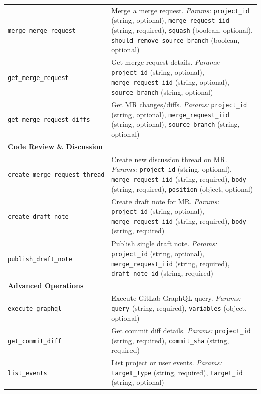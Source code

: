 \documentclass{article}
\theoremstyle{plain}
\theoremstyle{definition}
\theoremstyle{remark}
\begin{document}
{\begin{longtable}{p{4.5cm} p{10cm}}
\texttt{merge\_merge\_request} & Merge a merge request. \textit{Params:} \texttt{project\_id} (string, optional), \texttt{merge\_request\_iid} (string, required), \texttt{squash} (boolean, optional), \texttt{should\_remove\_source\_branch} (boolean, optional) \\

\texttt{get\_merge\_request} & Get merge request details. \textit{Params:} \texttt{project\_id} (string, optional), \texttt{merge\_request\_iid} (string, optional), \texttt{source\_branch} (string, optional) \\

\texttt{get\_merge\_request\_diffs} & Get MR changes/diffs. \textit{Params:} \texttt{project\_id} (string, optional), \texttt{merge\_request\_iid} (string, optional), \texttt{source\_branch} (string, optional) \\

\multicolumn{2}{l}{\textbf{Code Review \& Discussion}} \\
\texttt{create\_merge\_request\_thread} & Create new discussion thread on MR. \textit{Params:} \texttt{project\_id} (string, optional), \texttt{merge\_request\_iid} (string, required), \texttt{body} (string, required), \texttt{position} (object, optional) \\

\texttt{create\_draft\_note} & Create draft note for MR. \textit{Params:} \texttt{project\_id} (string, optional), \texttt{merge\_request\_iid} (string, required), \texttt{body} (string, required) \\

\texttt{publish\_draft\_note} & Publish single draft note. \textit{Params:} \texttt{project\_id} (string, optional), \texttt{merge\_request\_iid} (string, required), \texttt{draft\_note\_id} (string, required) \\

\multicolumn{2}{l}{\textbf{Advanced Operations}} \\
\texttt{execute\_graphql} & Execute GitLab GraphQL query. \textit{Params:} \texttt{query} (string, required), \texttt{variables} (object, optional) \\

\texttt{get\_commit\_diff} & Get commit diff details. \textit{Params:} \texttt{project\_id} (string, required), \texttt{commit\_sha} (string, required) \\

\texttt{list\_events} & List project or user events. \textit{Params:} \texttt{target\_type} (string, required), \texttt{target\_id} (string, optional) \\

\end{longtable}
}
\end{document}

